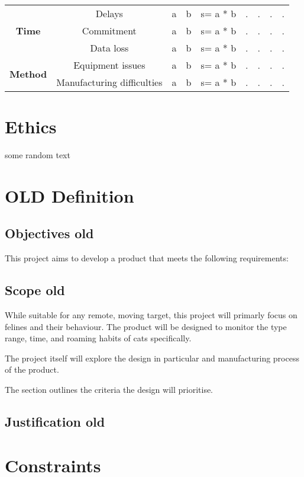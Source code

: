 \documentclass[11pt]{article}
\begin{document}
\begin{landscape}
\begin{adjustbox}{width=1.8\textwidth,center=\textwidth}
\begin{tabular}{ |c|c|c|c|c|c|c|c|c| }
\multirow{3}{*}{\textbf{Time}}
& Delays        & a & b & s= a * b & . & . & . & . \\ \cline{2-9}
& Commitment    & a & b & s= a * b & . & . & . & . \\ \cline{2-9}
& Data loss     & a & b & s= a * b & . & . & . & . \\ \cline{2-9}
\hline
\multirow{2}{*}{\textbf{Method}}
& Equipment issues              & a & b & s= a * b & . & . & . & . \\ \cline{2-9}
& Manufacturing difficulties    & a & b & s= a * b & . & . & . & . \\ \cline{2-9}
\hline
\end{tabular}
\end{adjustbox}
\end{landscape}


\section{Ethics}
some random text

\section{ OLD Definition}
\subsection{Objectives old}
\label{sec:objectives}
This project aims to develop a product that meets the following requirements:


\subsection{Scope old}
While suitable for any remote, moving target, this project will primarly focus on felines and their behaviour. 
The product will be designed to monitor the type range, time, and roaming habits of cats specifically. 

The project itself will explore the design in particular and manufacturing process of the product.

The  section outlines the criteria the design will prioritise. 

\subsection{Justification old}

\section{Constraints}
\end{document}
